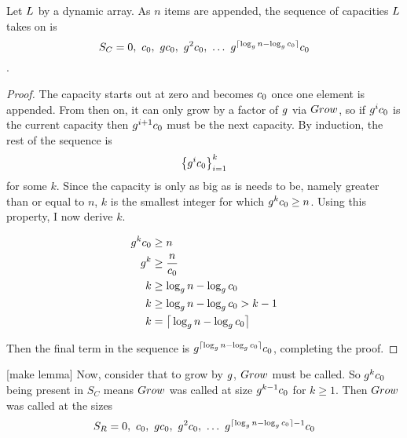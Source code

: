 
\begin{lemma}
\label{lem:CapacitySequence}
	Let $L$ by a dynamic array. As $n$ items are appended, the sequence of capacities $L$ takes on is $$S_C = 0,\ \VarInitCapacity,\ \VarGrowthFactor\VarInitCapacity,\ \VarGrowthFactor^2\VarInitCapacity,\ \ldots\ \VarGrowthFactor^{\lceil \log_{\VarGrowthFactor} n - \log_{\VarGrowthFactor} \VarInitCapacity \rceil}\VarInitCapacity$$.
\end{lemma}

\begin{proof}
	The capacity starts out at zero and becomes $c_0$ once one element is appended. From then on, it can only grow by a factor of $g$ via $Grow$, so if $g^ic_0$ is the current capacity then $g^{i + 1}c_0$ must be the next capacity. By induction, the rest of the sequence is $$\left\{ g^ic_0 \right\}_{i = 1}^k$$ for some $k$. Since the capacity is only as big as is needs to be, namely greater than or equal to $n$, $k$ is the smallest integer for which $g^kc_0 \geq n$. Using this property, I now derive $k$.
	
	\begin{align*}
	g^kc_0 &\geq n\\
	g^k &\geq \frac{n}{c_0}\\
	k &\geq \log_{g} n - \log_{g} c_0\\
	k &\geq \log_{g} n - \log_{g} c_0 > k - 1\\
	k &= \big\lceil \log_{g} n - \log_{g} c_0 \big\rceil
	\end{align*}
	
	Then the final term in the sequence is $g^{\lceil \log_{g} n - \log_{g} c_0 \rceil}c_0$, completing the proof.
\end{proof}

[make lemma]
Now, consider that to grow by $g$, $Grow$ must be called. So $g^kc_0$ being present in $S_C$ means $Grow$ was called at size $g^{k - 1}c_0$ for $k \geq 1$. Then $Grow$ was called at the sizes $$S_R = 0,\ \VarInitCapacity,\ \VarGrowthFactor\VarInitCapacity,\ \VarGrowthFactor^2\VarInitCapacity,\ \ldots\ \VarGrowthFactor^{\lceil \log_{\VarGrowthFactor} n - \log_{\VarGrowthFactor} \VarInitCapacity \rceil - 1}\VarInitCapacity$$

